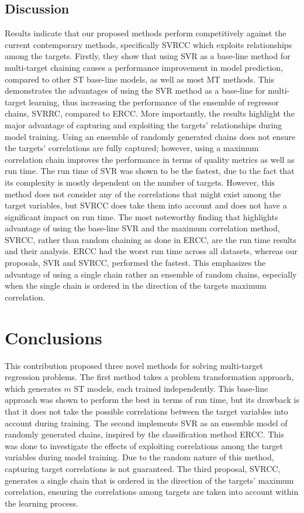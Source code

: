 \documentclass[reqno]{vcuthesis}
\numberwithin{equation}{chapter}
\begin{document}
\subsection{Discussion}\label{sec:discussion}
Results indicate that our proposed methods perform competitively against the current contemporary methods, specifically SVRCC which exploits relationships among the targets. Firstly, they show that using SVR as a base-line method for multi-target chaining causes a performance improvement in model prediction, compared to other ST base-line models, as well as most MT methods. This demonstrates the advantages of using the SVR method as a base-line for multi-target learning, thus increasing the performance of the ensemble of regressor chains, SVRRC, compared to ERCC. More importantly, the results highlight the major advantage of capturing and exploiting the targets' relationships during model training. Using an ensemble of randomly generated chains does not ensure the targets' correlations are fully captured; however, using a maximum correlation chain improves the performance in terms of quality metrics as well as run time. The run time of SVR was shown to be the fastest, due to the fact that its complexity is mostly dependent on the number of targets. However, this method does not consider any of the correlations that might exist among the target variables, but SVRCC does take them into account and does not have a significant impact on run time. The most noteworthy finding that highlights advantage of using the base-line SVR and the maximum correlation method, SVRCC, rather than random chaining as done in ERCC, are the run time results and their analysis. ERCC had the worst run time across all datasets, whereas our proposals, SVR and SVRCC, performed the fastest. This emphasizes the advantage of using a single chain rather an ensemble of random chains, especially when the single chain is ordered in the direction of the targets maximum correlation.

\section{Conclusions}\label{sec:MTRconclusions}
This contribution proposed three novel methods for solving multi-target regression problems. The first method takes a problem transformation approach, which generates $m$ ST models, each trained independently. This base-line approach was shown to perform the best in terms of run time, but its drawback  is that it does not take the possible correlations between the target variables into account during training. The second implements SVR as an ensemble model of randomly generated chains, inspired by the classification method ERCC. This was done to investigate the effects of exploiting correlations among the target variables during model training. Due to the random nature of this method, capturing target correlations is not guaranteed. The third proposal, SVRCC, generates a single chain that is ordered in the direction of the targets' maximum correlation, ensuring the correlations among targets are taken into account within the learning process.
\end{document}
